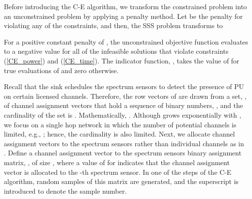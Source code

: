 \documentclass[journal]{IEEEtran} \ifCLASSINFOpdf
\begin{document}
Before introducing the C-E algorithm, we transform the constrained problem into an unconstrained problem by applying a penalty method. Let  be the penalty for violating any of the constraints, and then, the SSS problem transforms to

For a positive constant penalty of , the unconstrained objective function evaluates to a negative value for all of the infeasible solutions that violate constraints (\ref{CE_power}) and (\ref{CE_time}). The indicator function, , takes the value of  for true evaluations of  and zero otherwise.

Recall that the sink schedules the spectrum sensors to detect the presence of PU on certain licensed channels. Therefore, the row vectors of  are drawn from a set, , of channel assignment vectors that hold a sequence of binary numbers, , and the cardinality of the set is . Mathematically, . Although  grows exponentially with , we focus on a single hop network in which the number of potential channels is limited, e.g., ; hence, the cardinality  is also limited. Next, we allocate channel assignment vectors to the spectrum sensors rather than individual channels as in . Define a channel assignment vector to the spectrum sensors binary assignment matrix, , of size , where a value of  for  indicates that the  channel assignment vector  is allocated to the -th spectrum sensor. In one of the steps of the C-E algorithm, random samples of this matrix are generated, and the superscript  is introduced to denote the sample number.
\end{document}
